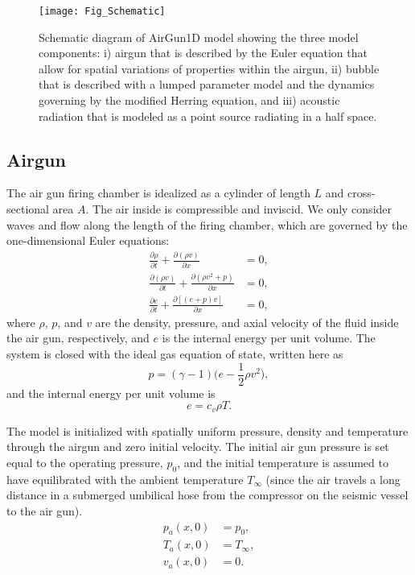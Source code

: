 \documentclass[10pt]{article}
\begin{document}
\begin{figure}[h!]
\centering
\texttt{[image: Fig\_Schematic]}
\caption{Schematic diagram of AirGun1D model showing the three model components: i) airgun that is described by the Euler equation that allow for spatial variations of properties within the airgun, ii) bubble that is described with a lumped parameter model and the dynamics governing by the modified Herring equation, and iii) acoustic radiation that is modeled as a point source radiating in a half space.}
\label{fig:schematic}
\end{figure}

\subsection{Airgun}
The air gun firing chamber is idealized as a cylinder of length $L$ and cross-sectional area $A$. The air inside is compressible and inviscid. We only consider waves and flow along the length of the firing chamber, which are governed by the one-dimensional Euler equations:
\begin{align}
\frac{\partial \rho}{\partial t} + \frac{\partial (\rho v)}{\partial x} & = 0, \\
\frac{\partial (\rho v)}{\partial t} + \frac{\partial (\rho v^2 + p)}{\partial x}
& = 0, \\
\frac{\partial e}{\partial t} + \frac{\partial [(e+p)v]}{\partial x} & = 0,
\end{align}
where $\rho$, $p$, and $v$ are the density, pressure, and axial velocity of the fluid inside the air gun, respectively, and $e$ is the internal energy per unit volume. The system is closed with the ideal gas equation of state, written here as
\begin{equation}
p = (\gamma-1)\bigg(e-\frac{1}{2} \rho v^2 \bigg),
\end{equation}
and the internal energy per unit volume is
\begin{equation}
e = c_v \rho T.
\end{equation}

The model is initialized with spatially uniform pressure, density and temperature through the airgun and zero initial velocity. The initial air gun pressure is set equal to the operating pressure, $p_0$, and the initial temperature is assumed to have equilibrated with the ambient temperature $T_{\infty}$ (since the air travels a long distance in a submerged umbilical hose from the compressor on the seismic vessel to the air gun). 
\begin{align}
p_a(x, 0) & = p_0, \\
T_a(x, 0) & = T_{\infty}, \\
v_a(x,0) & = 0.
\end{align}
\end{document}
